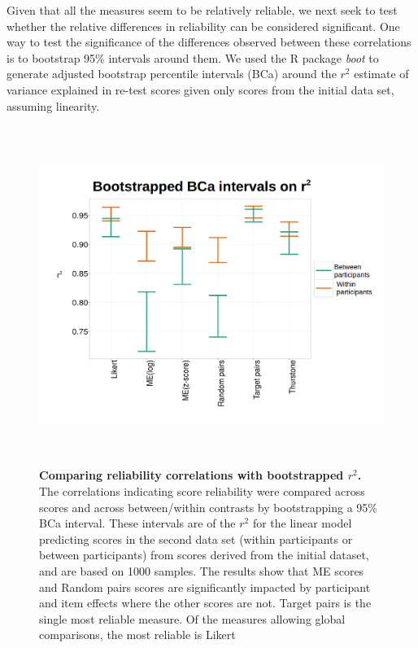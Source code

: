 \documentclass[doc]{apa6}
\newcommand{\targchoice}{{\sc Target pairs}}
\newcommand{\rndchoice}{{\sc Random pairs}}
\newcommand{\ME}{{\sc ME}}%
\newcommand{\likert}{{\sc Likert}}
\newcommand{\initial}{{\sc initial}}
\newcommand{\withinppnt}{{\sc within participants}}
\newcommand{\betweenppnt}{{\sc between participants}}
\begin{document}
Given that all the measures seem to be relatively reliable, we next seek to test whether the relative differences in reliability can be considered significant. One way to test the significance of the differences observed between these correlations is to bootstrap 95\% intervals around them. We used the R package {\it boot} \citep{boot_Rpkg} to generate adjusted bootstrap percentile intervals (BCa) around the $r^2$ estimate of variance explained in re-test scores
given only scores from the \initial{} data set, assuming linearity.

\begin{figure}[t]
\centering
\includegraphics[height=11cm,keepaspectratio]{figures/bootstrapCI_correlations.png}
\caption{{\small {\bf Comparing reliability correlations with bootstrapped $r^2$.} The correlations indicating score reliability were compared across scores and across between/within contrasts by bootstrapping a 95\% BCa interval. These intervals are of the $r^2$ for the linear model predicting scores in the second data set (\withinppnt{} or \betweenppnt) from scores derived from the \initial{} dataset, and are based on 1000 samples. The results show that \ME{} scores and \rndchoice{} scores are significantly impacted by participant and item effects where the other scores are not. \targchoice{} is the single most reliable measure. Of the measures allowing global comparisons, the most reliable is \likert
}}
\label{correlation_bootCI}
\end{figure}
\end{document}

